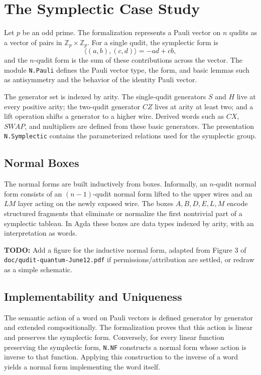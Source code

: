 \documentclass[acmsmall,screen,review,anonymous]{acmart}
\newcommand{\Agda}{Agda\xspace}
\newcommand{\Zp}{\mathbb{Z}_p}
\newcommand{\code}[1]{\texttt{#1}}
\newcommand{\codepath}[1]{\nolinkurl{#1}}
\newcommand{\todo}[1]{\textbf{TODO:} #1}
\begin{document}
\section{The Symplectic Case Study}
\label{sec:symplectic}

Let \(p\) be an odd prime. The formalization represents a Pauli vector on \(n\)
qudits as a vector of pairs in \(\Zp \times \Zp\). For a single qudit, the
symplectic form is
\[
  \langle (a,b),(c,d)\rangle = -a d + c b,
\]
and the \(n\)-qudit form is the sum of these contributions across the vector.
The module \code{N.Pauli} defines the Pauli vector type, the form, and basic
lemmas such as antisymmetry and the behavior of the identity Pauli vector.

The generator set is indexed by arity. The single-qudit generators \(S\) and
\(H\) live at every positive arity; the two-qudit generator \(CZ\) lives at
arity at least two; and a lift operation shifts a generator to a higher wire.
Derived words such as \(CX\), \(SWAP\), and multipliers are defined from these
basic generators. The presentation \code{N.Symplectic} contains the
parameterized relations used for the symplectic group.

\subsection{Normal Boxes}

The normal forms are built inductively from boxes. Informally, an \(n\)-qudit
normal form consists of an \((n-1)\)-qudit normal form lifted to the upper wires
and an \(LM\) layer acting on the newly exposed wire. The boxes \(A,B,D,E,L,M\)
encode structured fragments that eliminate or normalize the first nontrivial
part of a symplectic tableau. In \Agda these boxes are data types indexed by
arity, with an interpretation as words.

\todo{Add a figure for the inductive normal form, adapted from Figure 3 of
\codepath{doc/qudit-quantum-June12.pdf} if permissions/attribution are
settled, or redraw as a simple schematic.}

\subsection{Implementability and Uniqueness}

The semantic action of a word on Pauli vectors is defined generator by
generator and extended compositionally. The formalization proves that this
action is linear and preserves the symplectic form. Conversely, for every
linear function preserving the symplectic form, \code{N.NF} constructs a normal
form whose action is inverse to that function. Applying this construction to
the inverse of a word yields a normal form implementing the word itself.
\end{document}
